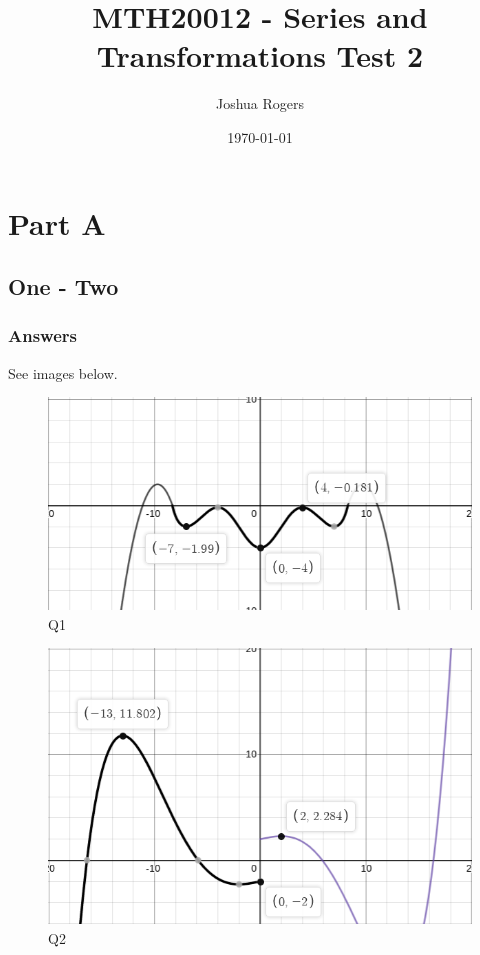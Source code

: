 \documentclass{article}
\title{\vspace{-4cm}MTH20012 - Series and Transformations Test 2}
\author{Joshua Rogers}
\date\today
\begin{document}
\maketitle 

\section*{Part A}
\subsection*{One - Two}
\subsubsection*{Answers}
See images below.
\begin{figure}
\centering
\includegraphics[width=1.0\textwidth]{./static/graph1.png}
\caption{Q1}
\end{figure}

\begin{figure}
\centering
\includegraphics[width=1.0\textwidth]{./static/graph2.png}
\caption{Q2}
\end{figure}
\end{document}
